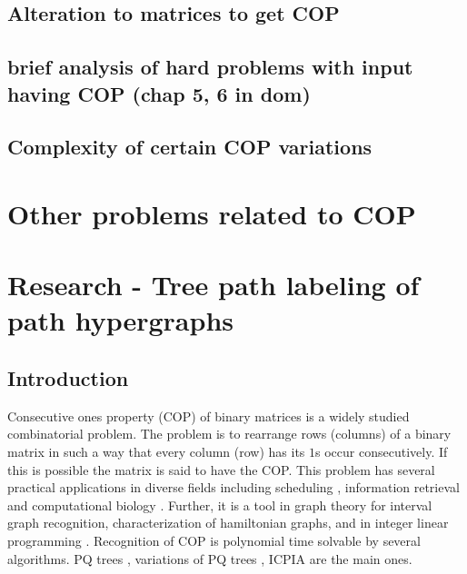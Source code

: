 \documentclass[MS]             %
              {iitmdiss}
\begin{document}
\section{Alteration to matrices to get COP}
\section{brief analysis of hard problems with input having COP (chap
  5, 6 in dom)}
\label{sec:briefanal}
\section{Complexity of certain COP variations}


\chapter{Other problems related to COP }





\chapter{Research - Tree path labeling of path hypergraphs}

\section{Introduction}
Consecutive ones property (COP) of binary matrices is a widely studied
combinatorial problem. The problem is to rearrange rows (columns) of a
binary matrix in such a way that every column (row) has its $1$s occur
consecutively. If this is possible the matrix is said to have the COP.
This problem has several practical applications in diverse fields
including scheduling \cite{hl06}, information retrieval \cite{k77} and
computational biology \cite{abh98}.  Further, it is a tool in graph
theory \cite{mcg04} for interval graph recognition, characterization
of hamiltonian graphs, and in integer linear programming
\cite{ht02,hl06}.  Recognition of COP is polynomial time solvable by
several algorithms. PQ trees \cite{bl76}, variations of PQ trees
\cite{mm09,wlh01,wlh02,mcc04}, ICPIA \cite{nsnrs09} are the main ones.
\end{document}
